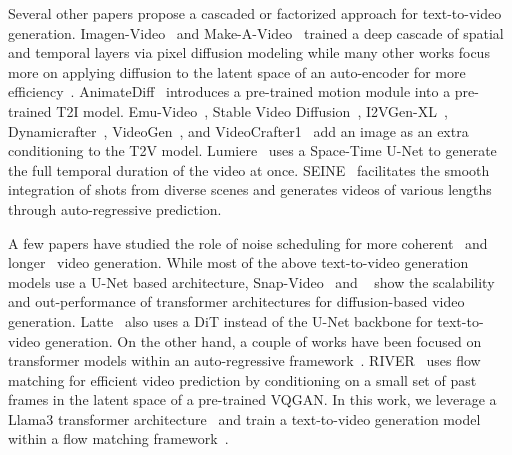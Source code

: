 Several other papers propose a cascaded or factorized approach for text-to-video generation.  Imagen-Video~\citep{ho2022imagen} and Make-A-Video~\citep{singer2023makeavideo} trained a deep cascade of spatial and temporal layers via pixel diffusion modeling while many other works focus more on applying diffusion to the latent space of an auto-encoder for more efficiency~\citep{Blattmann2023AlignYL, an2023latentshift, wang2023lavie, wang2023videofactory, modelscope}.
AnimateDiff~\citep{guo2023animatediff} introduces a pre-trained motion module into a pre-trained T2I model. Emu-Video~\citep{emuvideo2023}, Stable Video Diffusion~\citep{sdvideo}, I2VGen-XL~\citep{i2vgen}, Dynamicrafter~\citep{xing2023dynamicrafter}, VideoGen~\citep{li2023videogen}, and VideoCrafter1~\citep{chen2023videocrafter1} add an image as an extra conditioning to the T2V model. Lumiere~\citep{BarTal2024LumiereAS} uses a Space-Time U-Net to generate the full temporal duration of the video at once. SEINE~\citep{chen2023seine} facilitates the smooth integration of shots from diverse scenes and generates videos of various lengths through auto-regressive prediction.

A few papers have studied the role of noise scheduling for more coherent~\citep{ge2023preserve, qiu2023freenoise, luo2023videofusion} and longer~\citep{kim2024fifo} video generation.
While most of the above text-to-video generation models use a U-Net based architecture, Snap-Video~\citep{snapvideo} and \Sora~\citep{sora} show the scalability and out-performance of transformer architectures for diffusion-based video generation.
Latte~\citep{ma2024latte} also uses a DiT instead of the U-Net backbone for text-to-video generation. On the other hand, a couple of works have been focused on transformer models within an auto-regressive framework~\citep{yan2021videogpt, kondratyuk2023videopoet, hong2022cogvideo, wu2022nuwa, villegas2023phenaki, ge2022long}. RIVER~\citep{davtyan2023efficient} uses flow matching for efficient video prediction by conditioning on a small set of past frames in the latent space of a pre-trained VQGAN. In this work, we leverage a Llama3 transformer architecture~\citep{llama3} and train a text-to-video generation model within a flow matching framework~\citep{flow-matching}.


